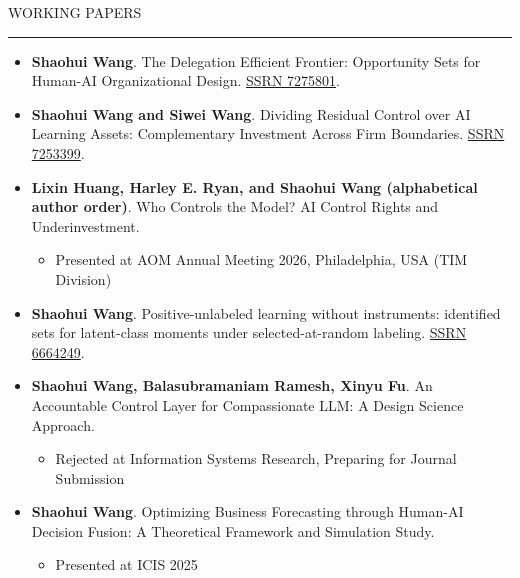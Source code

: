\documentclass{resume}
\renewenvironment{rSection}[1]{
\Needspace{5\baselineskip}
\sectionskip
\textcolor{RoyalPurple}{\MakeUppercase{#1}}
\sectionlineskip
\hrule
\begin{list}{}{
\setlength{\leftmargin}{1.5em}
}
\item[]
}{
\end{list}
}
\begin{document}
\begin{rSection}{Working Papers}
\begin{itemize}[leftmargin=0.7em]
    \item \textbf{Shaohui Wang}. The Delegation Efficient Frontier: Opportunity Sets for Human-AI Organizational Design. \href{https://papers.ssrn.com/sol3/papers.cfm?abstract_id=7275801}{SSRN 7275801}.

    \item \textbf{Shaohui Wang and Siwei Wang}. Dividing Residual Control over AI Learning Assets: Complementary Investment Across Firm Boundaries. \href{https://papers.ssrn.com/sol3/papers.cfm?abstract_id=7253399}{SSRN 7253399}.

    \item \textbf{Lixin Huang, Harley E. Ryan, and Shaohui Wang (alphabetical author order)}. Who Controls the Model? AI Control Rights and Underinvestment.
    \begin{itemize}
        \item Presented at AOM Annual Meeting 2026, Philadelphia, USA (TIM Division)
    \end{itemize}

  \item \textbf{Shaohui Wang}. Positive-unlabeled learning without instruments: identified sets for latent-class moments under selected-at-random labeling. \href{https://papers.ssrn.com/sol3/papers.cfm?abstract_id=6664249}{SSRN 6664249}.

    \item \textbf{Shaohui Wang, Balasubramaniam Ramesh, Xinyu Fu}. An Accountable Control Layer for Compassionate LLM: A Design Science Approach.
      \begin{itemize}
        \item Rejected at Information Systems Research, Preparing for Journal Submission
    \end{itemize}

    \item \textbf{Shaohui Wang}. Optimizing Business Forecasting through Human-AI Decision Fusion: A Theoretical Framework and Simulation Study.
    \begin{itemize}
        \item Presented at ICIS 2025
    \end{itemize}

\end{itemize}
\end{rSection}
\end{document}
